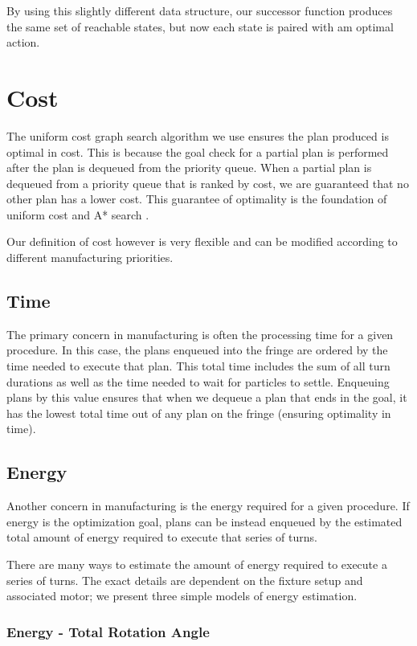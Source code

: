 By using this slightly different data structure, our successor function produces the same set of reachable states, but now each state is paired with am optimal action.

\section{Cost}

The uniform cost graph search algorithm we use ensures the plan produced is optimal in cost. This is because the goal check for a partial plan is performed after the plan is dequeued from the priority queue. When a partial plan is dequeued from a priority queue that is ranked by cost, we are guaranteed that no other plan has a lower cost. This guarantee of optimality is the foundation of uniform cost and A* search \cite{AIBook}.

Our definition of cost however is very flexible and can be modified according to different manufacturing priorities.

		\subsection{Time}

The primary concern in manufacturing is often the processing time for a given procedure. In this case, the plans enqueued into the fringe are ordered by the time needed to execute that plan. This total time includes the sum of all turn durations as well as the time needed to wait for particles to settle. Enqueuing plans by this value ensures that when we dequeue a plan that ends in the goal, it has the lowest total time out of any plan on the fringe (ensuring optimality in time).

		\subsection{Energy}

Another concern in manufacturing is the energy required for a given procedure. If energy is the optimization goal, plans can be instead enqueued by the estimated total amount of energy required to execute that series of turns.


There are many ways to estimate the amount of energy required to execute a series of turns. The exact details are dependent on the fixture setup and associated motor; we present three simple models of energy estimation.

		\subsubsection{Energy - Total Rotation Angle}

